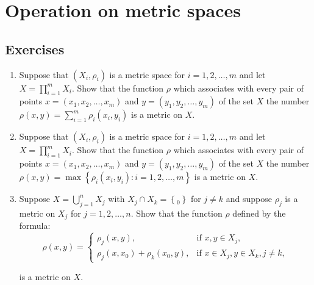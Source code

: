 \section{Operation on metric spaces}

\subsection*{Exercises}

\begin{enumerate}[label={(\alph*)}]
	\item Suppose that \( (X_{i}, \rho_{i}) \) is a metric space for \( i = 1, 2, \ldots, m \) and let \( X = \prod_{i=1}^{m} X_{i} \). Show that the function \( \rho \) which associates with every pair of points \( x = (x_{1}, x_{2}, \ldots, x_{m}) \) and \( y = (y_{1}, y_{2}, \ldots, y_{m}) \) of the set \( X \) the number \( \rho(x, y) = \sum_{i=1}^{m} \rho_{i}(x_{i}, y_{i}) \) is a metric on \( X \).
	\item Suppose that \( (X_{i}, \rho_{i}) \) is a metric space for \( i = 1, 2, \ldots, m \) and let \( X = \prod_{i=1}^{m} X_{i} \). Show that the function \( \rho \) which associates with every pair of points \( x = (x_{1}, x_{2}, \ldots, x_{m}) \) and \( y = (y_{1}, y_{2}, \ldots, y_{m}) \) of the set \( X \) the number \( \rho(x, y) = \max\left\{ \rho_{i}(x_{i}, y_{i}) : i = 1, 2, \ldots, m \right\} \) is a metric on \( X \).
	\item Suppose \( X = \bigcup_{j=1}^{n} X_{j} \) with \( X_{j} \cap X_{k} = \left\{ _{0} \right\} \) for \( j \ne k \) and suppose \( \rho_{j} \) is a metric on \( X_{j} \) for \( j = 1, 2, \ldots, n \). Show that the function \( \rho \) defined by the formula:
	      \[
		      \rho(x, y) = \begin{cases}
			      \rho_{j}(x, y),                          & \text{if } x, y \in X_{j},                    \\
			      \rho_{j}(x, x_{0}) + \rho_{k}(x_{0}, y), & \text{if } x \in X_{j}, y \in X_{k}, j \ne k,
		      \end{cases}
	      \]

	      is a metric on \( X \).
\end{enumerate}

